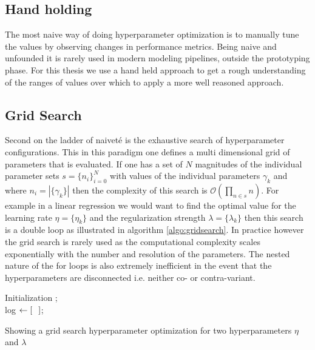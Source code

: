 \subsection{Hand holding}
The most naive way of doing hyperparameter optimization is to manually tune the values by observing changes in performance metrics. Being naive and unfounded it is rarely used in modern modeling pipelines, outside the prototyping phase. For this thesis we use a hand held approach to get a rough understanding of the ranges of values over which to apply a more well reasoned approach. 

\subsection{Grid Search}
Second on the ladder of naiveté is the exhaustive search of hyperparameter configurations. This in this paradigm one defines a multi dimensional grid of parameters that is evaluated. If one has a set of $N$ magnitudes of the individual parameter sets $s = \{n_i\}_{i=0}^{N}$ with values of the individual parameters $\gamma_k$ and where $n_i = |\{\gamma_k\}|$ then the complexity of this search is $\mathcal{O}(\prod_{n \in s} n)$. For example in a linear regression we would want to find the optimal value for the learning rate $\eta = \{\eta_k\}$ and the regularization strength $\lambda = \{\lambda_k\}$ then this search is a double loop as illustrated in algorithm \ref{algo:gridsearch}. In practice however the grid search is rarely used as the computational complexity scales exponentially with the number and resolution of the parameters. The nested nature of the for loops is also extremely inefficient in the event that the hyperparameters are disconnected i.e. neither co- or contra-variant.  

\begin{algorithm}[H]
\SetAlgoLined
{}
Initialization ;\\
log $\leftarrow [\hspace{0.1in}]$;\\
\caption{Showing a grid search hyperparameter optimization for two hyperparameters $\eta$ and $\lambda$}\label{algo:gridsearch}
\end{algorithm}


